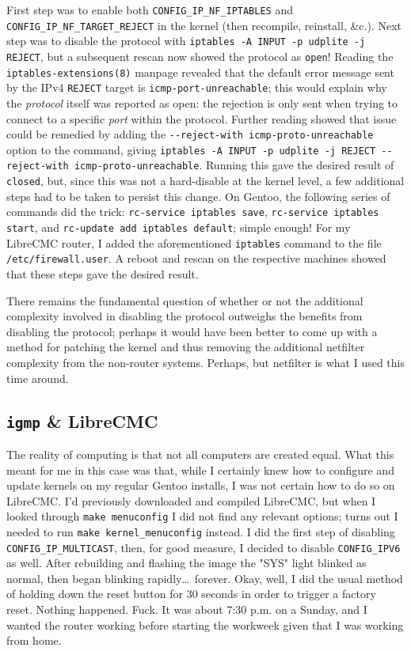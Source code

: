 \documentclass{article}
\begin{document}
First step was to enable both \texttt{CONFIG_IP_NF_IPTABLES} and \texttt{CONFIG_IP_NF_TARGET_REJECT} in the kernel (then recompile, reinstall, \&c.).  Next step was to disable the protocol with \texttt{iptables -A INPUT -p udplite -j REJECT}, but a subsequent rescan now showed the protocol as \texttt{open}!  Reading the \texttt{iptables-extensions(8)} manpage revealed that the default error message sent by the IPv4 \texttt{REJECT} target is \texttt{icmp-port-unreachable}; this would explain why the \emph{protocol} itself was reported as open: the rejection is only sent when trying to connect to a specific \emph{port} within the protocol.  Further reading showed that issue could be remedied by adding the \texttt{\verb|--|\texttt{reject-with icmp-proto-unreachable}} option to the command, giving \texttt{iptables -A INPUT -p udplite -j REJECT \verb|--|reject-with icmp-proto-unreachable}.  Running this gave the desired result of \texttt{closed}, but, since this was not a hard-disable at the kernel level, a few additional steps had to be taken to persist this change.  On Gentoo, the following series of commands did the trick: \texttt{rc-service iptables save}, \texttt{rc-service iptables start}, and \texttt{rc-update add iptables default}; simple enough!  For my LibreCMC router, I added the aforementioned \texttt{iptables} command to the file \texttt{/etc/firewall.user}.  A reboot and rescan on the respective machines showed that these steps gave the desired result.

There remains the fundamental question of whether or not the additional complexity involved in disabling the protocol outweighs the benefits from disabling the protocol; perhaps it would have been better to come up with a method for patching the kernel and thus removing the additional netfilter complexity from the non-router systems.  Perhaps, but netfilter is what I used this time around.

\subsection{\texttt{igmp} \& LibreCMC}
The reality of computing is that not all computers are created equal.  What this meant for me in this case was that, while I certainly knew how to configure and update kernels on my regular Gentoo installs, I was not certain how to do so on LibreCMC.  I'd previously downloaded and compiled LibreCMC, but when I looked through \texttt{make menuconfig} I did not find any relevant options; turns out I needed to run \texttt{make kernel_menuconfig} instead.  I did the first step of disabling \texttt{CONFIG_IP_MULTICAST}, then, for good measure, I decided to disable \texttt{CONFIG_IPV6} as well.  After rebuilding and flashing the image the "SYS" light blinked as normal, then began blinking rapidly\ldots~forever.  Okay, well, I did the usual method of holding down the reset button for 30 seconds in order to trigger a factory reset.  Nothing happened.  Fuck.  It was about 7:30 p.m. on a Sunday, and I wanted the router working before starting the workweek given that I was working from home.
\end{document}
